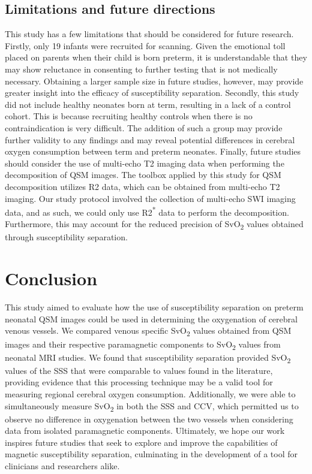 \documentclass[
true
]{sn-jnl}
\begin{document}
\subsection{Limitations and future
directions}\label{limitations-and-future-directions}

This study has a few limitations that should be considered for future
research. Firstly, only 19 infants were recruited for scanning. Given
the emotional toll placed on parents when their child is born preterm,
it is understandable that they may show reluctance in consenting to
further testing that is not medically necessary. Obtaining a larger
sample size in future studies, however, may provide greater insight into
the efficacy of susceptibility separation. Secondly, this study did not
include healthy neonates born at term, resulting in a lack of a control
cohort. This is because recruiting healthy controls when there is no
contraindication is very difficult. The addition of such a group may
provide further validity to any findings and may reveal potential
differences in cerebral oxygen consumption between term and preterm
neonates. Finally, future studies should consider the use of multi-echo
T2 imaging data when performing the decomposition of QSM images. The
toolbox applied by this study for QSM decomposition
\citep{shinHseparationMagneticSusceptibility2021} utilizes R2 data,
which can be obtained from multi-echo T2 imaging. Our study protocol
involved the collection of multi-echo SWI imaging data, and as such, we
could only use R2\textsuperscript{*} data to perform the decomposition.
Furthermore, this may account for the reduced precision of
SvO\textsubscript{2} values obtained through susceptibility separation.

\section{Conclusion}\label{sec-conclusion}

This study aimed to evaluate how the use of susceptibility separation on
preterm neonatal QSM images could be used in determining the oxygenation
of cerebral venous vessels. We compared venous specific
SvO\textsubscript{2} values obtained from QSM images and their
respective paramagnetic components to SvO\textsubscript{2} values from
neonatal MRI studies. We found that susceptibility separation provided
SvO\textsubscript{2} values of the SSS that were comparable to values
found in the literature, providing evidence that this processing
technique may be a valid tool for measuring regional cerebral oxygen
consumption. Additionally, we were able to simultaneously measure
SvO\textsubscript{2} in both the SSS and CCV, which permitted us to
observe no difference in oxygenation between the two vessels when
considering data from isolated paramagnetic components. Ultimately, we
hope our work inspires future studies that seek to explore and improve
the capabilities of magnetic susceptibility separation, culminating in
the development of a tool for clinicians and researchers alike.
\end{document}
